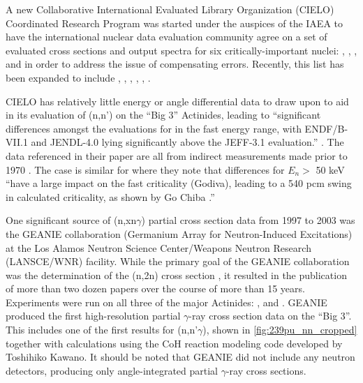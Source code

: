 \documentclass[letterpaper]{ar-1col}
\begin{document}
A new Collaborative International Evaluated Library Organization (CIELO) Coordinated Research Program was started under the auspices of the IAEA \cite{Cha18a} to have the international nuclear data evaluation community agree on a set of evaluated cross sections and output spectra for six critically-important nuclei: , , ,  and  in order to address the issue of compensating errors.
 Recently, this list has been expanded to include , , , , , .

CIELO has relatively little energy or angle differential data to draw upon to aid in its evaluation of (n,n') on the \enquote{Big 3} Actinides, leading to \enquote{significant differences amongst the evaluations for  in the fast energy range, with ENDF/B-VII.1 and JENDL-4.0 lying significantly above the JEFF-3.1 evaluation.} \cite{Cha14}.
 The  data referenced in their paper are all from indirect measurements made prior to 1970 \cite{Batchelor1969, Andreev1961}.
 The case is similar for  where they note that differences for $E_n >$ 50 keV \enquote{have a large impact on the fast criticality (Godiva), leading to a 540 pcm swing in calculated criticality, as shown by Go Chiba \cite{Chi12}.}

One significant source of (n,xn$\gamma$) partial cross section data from 1997 to 2003 was the GEANIE collaboration (Germanium Array for Neutron-Induced Excitations) at the Los Alamos Neutron Science Center/Weapons Neutron Research (LANSCE/WNR) facility.
While the primary goal of the GEANIE collaboration was the determination of the (n,2n) cross section \cite{Ber02}, it resulted in the publication of more than two dozen papers over the course of more than 15 years.
 Experiments were run on all three of the major Actinides:  \cite{You01},  \cite{Ber02} and  \cite{Fot04}.
 GEANIE produced the first high-resolution partial $\gamma$-ray cross section data on the \enquote{Big 3}.
This includes one of the first results for (n,n'$\gamma$), shown in \autoref{fig:239pu_nn_cropped}  together with calculations using the CoH reaction modeling code developed by Toshihiko Kawano. 
 It should be noted that GEANIE did not include any neutron detectors, producing only angle-integrated partial $\gamma$-ray cross sections.
\end{document}
